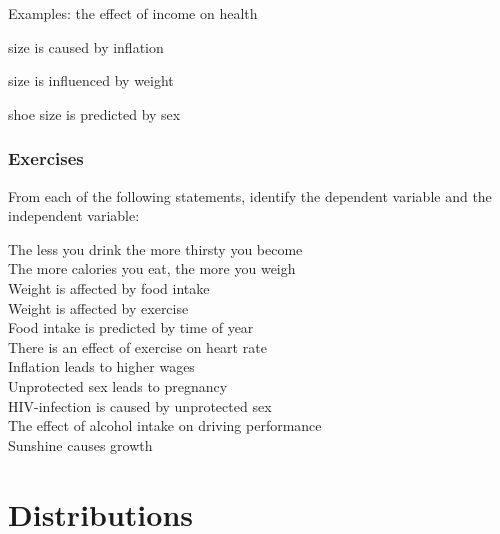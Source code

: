 Examples: the effect of income on health

size is caused by inflation

size is influenced by weight

shoe size is predicted by sex


\subsubsection{Exercises} 


From each of the following statements, identify the dependent variable and the independent variable:

The less you drink the more thirsty you become \\
The more calories you eat, the more you weigh\\
Weight is affected by food intake \\
Weight is affected by exercise \\
Food intake is predicted by time of year \\
There is an effect of exercise on heart rate \\
Inflation leads to higher wages \\
Unprotected sex leads to pregnancy \\
HIV-infection is caused by unprotected sex\\
The effect of alcohol intake on driving performance\\
Sunshine causes growth

\section{Distributions}


\begin{knitrout}
\color{fgcolor}\begin{kframe}


{\ttfamily\noindent\bfseries{}}

{\ttfamily\noindent\bfseries{}}\end{kframe}
\end{knitrout}






